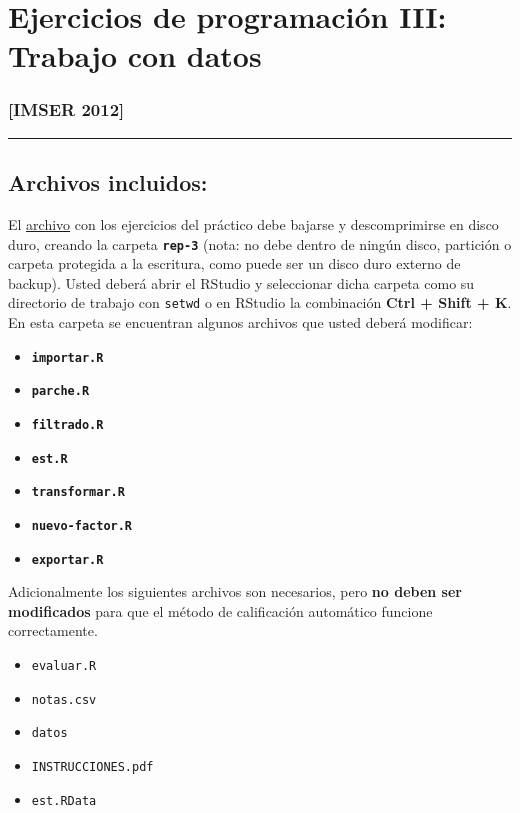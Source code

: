 \documentclass[]{article}
\begin{document}
\section{Ejercicios de programación III: Trabajo con datos}

\subsubsection{{[}IMSER 2012{]}}

\begin{center}\rule{3in}{0.4pt}\end{center}

\subsection{Archivos incluidos:}

El \href{http://goo.gl/eFUKY}{archivo} con los ejercicios del práctico
debe bajarse y descomprimirse en disco duro, creando la carpeta
\textbf{\texttt{rep-3}} (nota: no debe dentro de ningún disco, partición
o carpeta protegida a la escritura, como puede ser un disco duro externo
de backup). Usted deberá abrir el RStudio y seleccionar dicha carpeta
como su directorio de trabajo con \texttt{setwd} o en RStudio la
combinación \textbf{Ctrl + Shift + K}. En esta carpeta se encuentran
algunos archivos que usted deberá modificar:

\begin{itemize}
\item
  \textbf{\texttt{importar.R}}
\item
  \textbf{\texttt{parche.R}}
\item
  \textbf{\texttt{filtrado.R}}
\item
  \textbf{\texttt{est.R}}
\item
  \textbf{\texttt{transformar.R}}
\item
  \textbf{\texttt{nuevo-factor.R}}
\item
  \textbf{\texttt{exportar.R}}
\end{itemize}
Adicionalmente los siguientes archivos son necesarios, pero \textbf{no
deben ser modificados} para que el método de calificación automático
funcione correctamente.

\begin{itemize}
\item
  \texttt{evaluar.R}
\item
  \texttt{notas.csv}
\item
  \texttt{datos}
\item
  \texttt{INSTRUCCIONES.pdf}
\item
  \texttt{est.RData}
\end{itemize}
\end{document}
